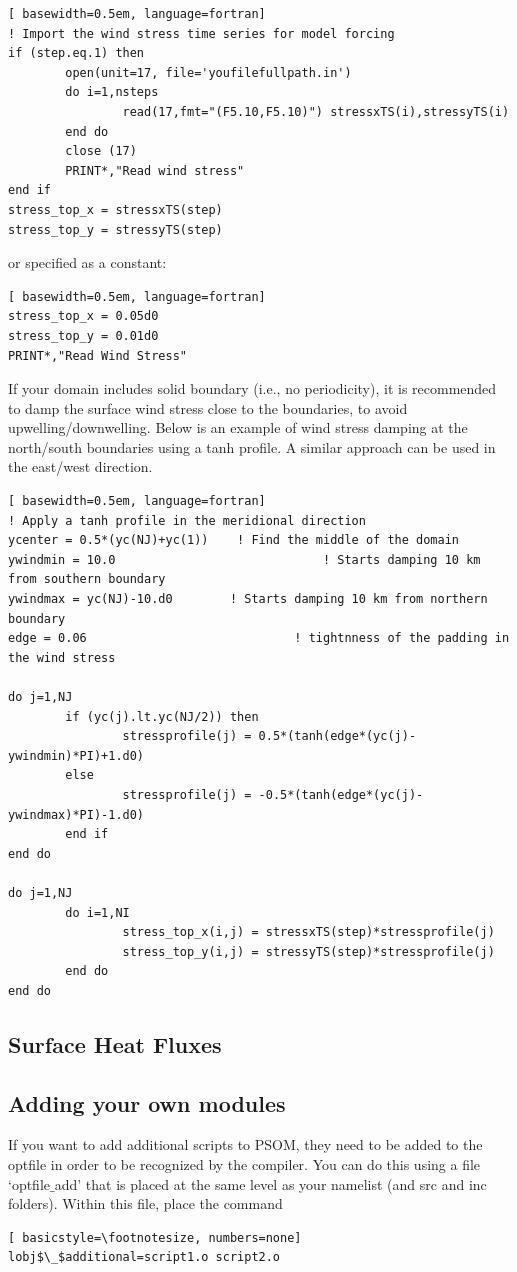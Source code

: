 \documentclass[12pt,letterpaper,titlepage]{article}
\begin{document}
\begin{lstlisting}[	basewidth=0.5em, language=fortran]
! Import the wind stress time series for model forcing
if (step.eq.1) then
		open(unit=17, file='youfilefullpath.in')
		do i=1,nsteps
				read(17,fmt="(F5.10,F5.10)") stressxTS(i),stressyTS(i)
		end do
		close (17)
		PRINT*,"Read wind stress"
end if
stress_top_x = stressxTS(step)
stress_top_y = stressyTS(step)
\end{lstlisting}	
or specified as a constant:

\begin{lstlisting}[	basewidth=0.5em, language=fortran]
stress_top_x = 0.05d0
stress_top_y = 0.01d0
PRINT*,"Read Wind Stress"
\end{lstlisting}	

If your domain includes solid boundary (i.e., no periodicity), it is recommended to damp the surface wind stress close to the boundaries, to avoid upwelling/downwelling. Below is an example of wind stress damping at the north/south boundaries using a tanh profile. A similar approach can be used in the east/west direction.

\begin{lstlisting}[	basewidth=0.5em, language=fortran]
! Apply a tanh profile in the meridional direction
ycenter = 0.5*(yc(NJ)+yc(1))	! Find the middle of the domain
ywindmin = 10.0 							! Starts damping 10 km from southern boundary
ywindmax = yc(NJ)-10.d0   	   ! Starts damping 10 km from northern boundary
edge = 0.06    							! tightnness of the padding in the wind stress

do j=1,NJ
		if (yc(j).lt.yc(NJ/2)) then
				stressprofile(j) = 0.5*(tanh(edge*(yc(j)-ywindmin)*PI)+1.d0)
		else
				stressprofile(j) = -0.5*(tanh(edge*(yc(j)-ywindmax)*PI)-1.d0)
		end if
end do

do j=1,NJ
		do i=1,NI
				stress_top_x(i,j) = stressxTS(step)*stressprofile(j)
				stress_top_y(i,j) = stressyTS(step)*stressprofile(j)
		end do
end do
\end{lstlisting}	

\subsection{Surface Heat Fluxes}

\subsection{Adding your own modules}
If you want to add additional scripts to PSOM, they need to be added to the optfile in order to be recognized by the compiler. You can do this using a file `optfile$\_$add' that is placed at the same level as your namelist (and src and inc folders). Within this file, place the command 
\begin{lstlisting}[	basicstyle=\footnotesize, numbers=none]
lobj$\_$additional=script1.o script2.o
\end{lstlisting}
\end{document}
